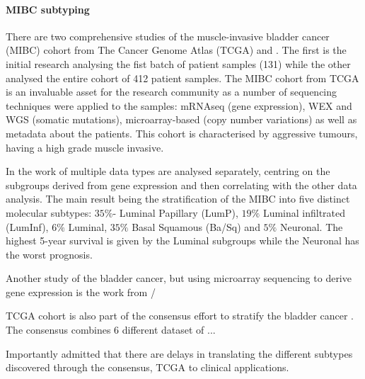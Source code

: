 \paragraph*{MIBC subtyping}

There are two comprehensive studies of the muscle-invasive bladder cancer (MIBC) cohort from The Cancer Genome Atlas (TCGA) \citet{Tcga2014-dr} and \citet{Robertson2017-mg}. The first is the initial research analysing the fist batch of patient samples (131) while the other analysed the entire cohort of 412 patient samples. The MIBC cohort from TCGA is an invaluable asset for the research community as a number of sequencing techniques were applied to the samples: mRNAseq (gene expression), WEX and WGS (somatic mutations), microarray-based (copy number variations) as well as metadata about the patients. This cohort is characterised by aggressive tumours, having a high grade muscle invasive.

In the work of \citet{Robertson2017-mg} multiple data types are analysed separately, centring on the subgroups derived from gene expression and then correlating with the other data analysis. The main result being the stratification of the MIBC into five distinct molecular subtypes: $35\%$- Luminal Papillary (LumP), $19\%$ Luminal infiltrated (LumInf), $6\%$ Luminal, $35\%$ Basal Squamous (Ba/Sq) and $5\%$ Neuronal. The highest 5-year survival is given by the Luminal subgroups while the Neuronal has the worst prognosis. 

Another study of the bladder cancer, but using microarray sequencing to derive gene expression is the work from \citet{Marzouka2018-ge}/

TCGA cohort is also part of the consensus effort to stratify the bladder cancer \citet{Kamoun2020-tj}. The consensus combines 6 different dataset of ... 

Importantly \citet{Kamoun2020-tj} admitted that there are delays in translating the different subtypes discovered through the consensus, TCGA to clinical applications. 

